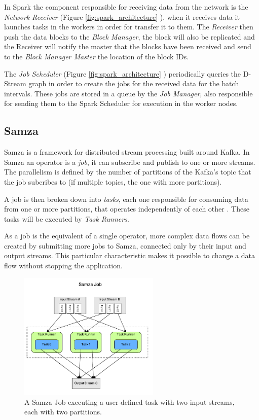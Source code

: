 \documentclass[ppgc,diss,english]{iiufrgs}
\begin{document}
In Spark the component responsible for receiving data from the network is the \emph{Network Receiver} (Figure \ref{fig:spark_architecture} ), when it receives data it launches tasks in the workers in order for transfer it to them. The \emph{Receiver} then push the data blocks to the \emph{Block Manager}, the block will also be replicated and the Receiver will notify the master that the blocks have been received and send to the \emph{Block Manager Master} the location of the block IDs.

The \emph{Job Scheduler} (Figure \ref{fig:spark_architecture} ) periodically queries the D-Stream graph in order to create the jobs for the received data for the batch intervals. These jobs are stored in a queue by the \emph{Job Manager}, also responsible for sending them to the Spark Scheduler for execution in the worker nodes.


\subsection{Samza}

Samza is a framework for distributed stream processing built around Kafka. In Samza an operator is a \emph{job}, it can subscribe and publish to one or more streams. The parallelism is defined by the number of partitions of the Kafka's topic that the job subcribes to (if multiple topics, the one with more partitions). 

A job is then broken down into \emph{tasks}, each one responsible for consuming data from one or more partitions, that operates independently of each other \cite{ramesh2015samza}. These tasks will be executed by \emph{Task Runners}.

As a job is the equivalent of a single operator, more complex data flows can be created by submitting more jobs to Samza, connected only by their input and output streams. This particular characteristic makes it possible to change a data flow without stopping the application.

\begin{figure}[!ht]
	\centering
	\includegraphics[width=0.6\textwidth]{images/samza/job_2.pdf}
	\caption[A Samza Job executing a user-defined task]{A Samza Job executing a user-defined task with two input streams, each with two partitions.}
	\label{fig:samza_job_execution}
\end{figure}
\end{document}
